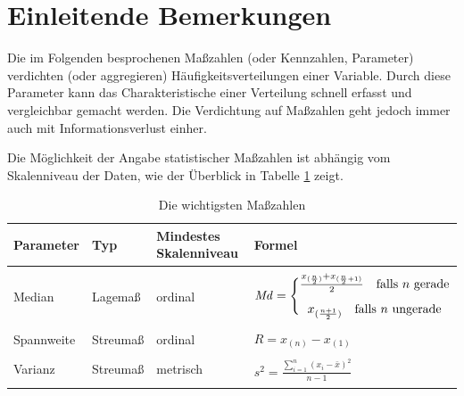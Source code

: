 \documentclass[
  11pt,
  ngerman,
  a4paper,
]{report}
\begin{document}
\hypertarget{einleitende-bemerkungen}{%
\section{Einleitende Bemerkungen}\label{einleitende-bemerkungen}}

Die im Folgenden besprochenen Maßzahlen (oder Kennzahlen, Parameter) verdichten (oder aggregieren) Häufigkeitsverteilungen einer Variable. Durch diese Parameter kann das Charakteristische einer Verteilung schnell erfasst und vergleichbar gemacht werden. Die Verdichtung auf Maßzahlen geht jedoch immer auch mit Informationsverlust einher.

Die Möglichkeit der Angabe statistischer Maßzahlen ist abhängig vom Skalenniveau der Daten, wie der Überblick in Tabelle \ref{tab:mass} zeigt.

\begin{table}

\caption{\label{tab:mass}Die wichtigsten Maßzahlen}
\centering
\begin{tabular}[t]{>{\raggedright\arraybackslash}p{8cm}ll>{\raggedright\arraybackslash}p{8cm}}
\toprule
\textbf{Parameter} & \textbf{Typ} & \textbf{Mindestes Skalenniveau} & \textbf{Formel}\\
\midrule
\cellcolor{gray!6}{Modalwert} & \cellcolor{gray!6}{Lagemaß} & \cellcolor{gray!6}{nominal} & \cellcolor{gray!6}{\medskip$\mathit{Mo}$}\\
Median & Lagemaß & ordinal & \medskip$\def\arraystretch{1.2} \mathit{Md} = \Bigg\{\begin{array}{@{}c@{}}\frac{x_{(\frac{n}{2})}+x_{(\frac{n}{2}+1)}}{2} \quad \textrm{falls }n \textrm{ gerade}\\[6pt] x_{(\frac{n+1}{2})}\quad \textrm{falls }n \textrm{ ungerade}\end{array}$\\
\cellcolor{gray!6}{Arithmetisches Mittel} & \cellcolor{gray!6}{Lagemaß} & \cellcolor{gray!6}{metrisch} & \cellcolor{gray!6}{\medskip$\bar{x}=\frac{\sum\limits_{i=1}^{n}x _{i}}{n}$}\\
Spannweite & Streumaß & ordinal & \medskip$R=x_{(n)}-x_{(1)}$\\
\cellcolor{gray!6}{Quartilsabstand} & \cellcolor{gray!6}{Streumaß} & \cellcolor{gray!6}{ordinal} & \cellcolor{gray!6}{\medskip$\mathit{IQR}=Q_3-Q_1$}\\
Varianz & Streumaß & metrisch & \medskip$s^2=\frac{\sum\limits_{i=1}^{n}(x_{i}-\bar{x})^2}{n-1}$\\
\cellcolor{gray!6}{Standardabweichung} & \cellcolor{gray!6}{Streumaß} & \cellcolor{gray!6}{metrisch} & \cellcolor{gray!6}{\medskip$s=\sqrt{s^2}$}\\
\bottomrule
\end{tabular}
\end{table}
\end{document}

